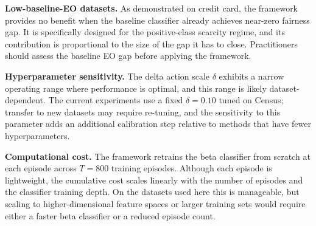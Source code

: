 \textbf{Low-baseline-EO datasets.}
As demonstrated on credit card, the framework provides no benefit when the
baseline classifier already achieves near-zero fairness gap.
It is specifically designed for the positive-class scarcity regime, and its
contribution is proportional to the size of the gap it has to close.
Practitioners should assess the baseline EO gap before applying the framework.

\textbf{Hyperparameter sensitivity.}
The delta action scale $\delta$ exhibits a narrow operating range where
performance is optimal, and this range is likely dataset-dependent.
The current experiments use a fixed $\delta = 0.10$ tuned on Census; transfer
to new datasets may require re-tuning, and the sensitivity to this parameter
adds an additional calibration step relative to methods that have fewer
hyperparameters.

\textbf{Computational cost.}
The framework retrains the beta classifier from scratch at each episode across
$T = 800$ training episodes.
Although each episode is lightweight, the cumulative cost scales linearly with
the number of episodes and the classifier training depth.
On the datasets used here this is manageable, but scaling to higher-dimensional
feature spaces or larger training sets would require either a faster beta
classifier or a reduced episode count.


